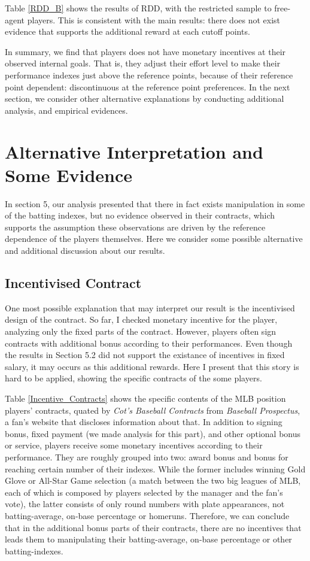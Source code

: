 \documentclass[dvipdfmx, 12pt]{article}
\begin{document}
Table \ref{RDD_B} shows the results of RDD, with the restricted sample to free-agent players. This is consistent with the main results: there does not exist evidence that supports the additional reward at each cutoff points.

In summary, we find that players does not have monetary incentives at their observed internal goals. That is, they adjust their effort level to make their performance indexes just above the reference points, because of their reference point dependent: discontinuous at the reference point preferences. In the next section, we consider other alternative explanations by conducting additional analysis, and empirical evidences.

\section{Alternative Interpretation and Some Evidence}

In section 5, our analysis presented that there in fact exists manipulation in some of the batting indexes, but no evidence observed in their contracts, which supports the assumption these observations are driven by the reference dependence of the players themselves. Here we consider some possible alternative and additional discussion about our results.

\subsection{Incentivised Contract}

One most possible explanation that may interpret our result is the incentivised design of the contract. So far, I checked monetary incentive for the player, analyzing only the fixed parts of the contract. However, players often sign contracts with additional bonus according to their performances. Even though the results in Section 5.2 did not support the existance of incentives in fixed salary, it may occurs as this additional rewards. Here I present that this story is hard to be applied, showing the specific contracts of the some players.

Table \ref{Incentive_Contracts} shows the specific contents of the MLB position players' contracts, quated by \textit{Cot's Baseball Contracts} from \textit{Baseball Prospectus}, a fan's website that discloses information about that. In addition to signing bonus, fixed payment (we made analysis for this part), and other optional bonus or service, players receive some monetary incentives according to their performance. They are roughly grouped into two: award bonus and bonus for reaching certain number of their indexes. While the former includes winning Gold Glove or All-Star Game selection (a match between the two big leagues of MLB, each of which is composed by players selected by the manager and the fan's vote), the latter consists of only round numbers with plate appearances, not batting-average, on-base percentage or homeruns. Therefore, we can conclude that in the additional bonus parts of their contracts, there are no incentives that leads them to manipulating  their batting-average, on-base percentage or other batting-indexes.
\end{document}
